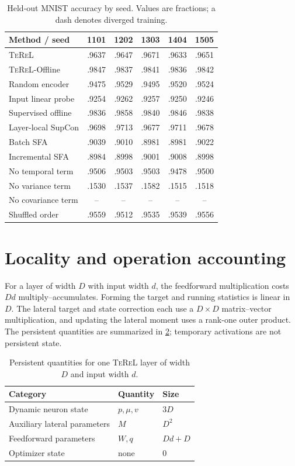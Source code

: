 \documentclass[11pt]{article}
\newcommand{\TeReL}{\textsc{TeReL}}
\newcommand{\TeReLOffline}{\TeReL{}-Offline}
\begin{document}
\begin{table}[ht]
\centering
\caption{Held-out MNIST accuracy by seed. Values are
fractions; a dash denotes diverged training.}
\label{tab:raw}
\small
\begin{tabular}{lccccc}
\toprule
Method / seed & 1101 & 1202 & 1303 & 1404 & 1505 \\
\midrule
\TeReL{} & .9637 & .9647 & .9671 & .9633 & .9651 \\
\TeReLOffline{} & .9847 & .9837 & .9841 & .9836 & .9842 \\
Random encoder & .9475 & .9529 & .9495 & .9520 & .9524 \\
Input linear probe & .9254 & .9262 & .9257 & .9250 & .9246 \\
Supervised offline & .9836 & .9858 & .9840 & .9846 & .9838 \\
Layer-local SupCon & .9698 & .9713 & .9677 & .9711 & .9678 \\
Batch SFA & .9039 & .9010 & .8981 & .8981 & .9022 \\
Incremental SFA & .8984 & .8998 & .9001 & .9008 & .8998 \\
No temporal term & .9506 & .9503 & .9503 & .9478 & .9500 \\
No variance term & .1530 & .1537 & .1582 & .1515 & .1518 \\
No covariance term & -- & -- & -- & -- & -- \\
Shuffled order & .9559 & .9512 & .9535 & .9539 & .9556 \\
\bottomrule
\end{tabular}
\end{table}

\section{Locality and operation accounting}

For a layer of width $D$ with input width $d$, the feedforward multiplication
costs $Dd$ multiply--accumulates. Forming the target and running statistics is
linear in $D$. The lateral target and state correction each use a
$D\times D$ matrix--vector multiplication, and updating the lateral moment
uses a rank-one outer product. The persistent quantities are summarized in
\cref{tab:resources}; temporary activations are not persistent state.

\begin{table}[ht]
\centering
\caption{Persistent quantities for one \TeReL{} layer of width $D$ and input
width $d$.}
\label{tab:resources}
\small
\begin{tabular}{lll}
\toprule
Category & Quantity & Size \\
\midrule
Dynamic neuron state & $p,\mu,v$ & $3D$ \\
Auxiliary lateral parameters & $M$ & $D^2$ \\
Feedforward parameters & $W,q$ & $Dd+D$ \\
Optimizer state & none & $0$ \\
\bottomrule
\end{tabular}
\end{table}
\end{document}
